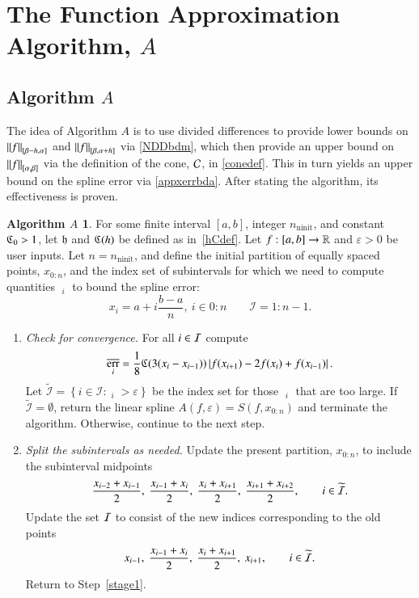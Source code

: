 \documentclass[review]{elsarticle}
\newcommand{\abstol}{\varepsilon}
\newcommand{\zton}{0\!:\!n}
\theoremstyle{definition}
\newtheorem*{algoA}{Algorithm $A$}
\DeclareMathOperator{\ninit}{ninit}
\DeclareMathOperator{\oerr}{\overline{err}}
\begin{document}
\section{The Function Approximation Algorithm, $A$}\label{sec:fappx}


\subsection{Algorithm $A$} \label{subsec:appxalgo}

The idea of Algorithm $A$ is to use divided differences to provide lower bounds on $\norm[{[\beta - h, \alpha]}]{f}$ and $\norm[{[\beta, \alpha+h]}]{f}$ via \eqref{NDDbdm}, which then provide an upper bound on $\norm[{[\alpha,\beta]}]{f}$ via the definition of the cone, $\cc$, in \eqref{conedef}.  This in turn yields an upper bound on the spline error via \eqref{appxerrbda}.  After stating the algorithm, its effectiveness is proven.

\begin{algoA} \label{AlgoA}
For some finite interval $[a,b]$, integer $n_{\ninit}$, and constant $\fC_0 > 1$, let $\fh$ and $\fC(h)$ be defined as in~\eqref{hCdef}.  Let $f:[a,b] \to \reals$ and $\abstol >0$ be user inputs. Let
$n=n_{\ninit}$, and define the initial partition of equally spaced points, $x_{0:n}$, and the index set of subintervals for which we need to compute quantities $\oerr_i$ to bound the spline error:
\[
x_i=a+ i\frac{b-a}{n}, \ i \in \zton \qquad \mathcal{I} = 1\!:\!n-1.
\]

\begin{enumerate}[\em Step 1.]%

\item \label{stage1} \emph{Check for convergence.} For all $i \in \ci$ compute
\begin{equation} \label{oerrdef}
\oerr_i = \frac{1}{8} \fC(3(x_i - x_{i-1}))\abs{f(x_{i+1}) - 2f(x_i) + f(x_{i-1})}.
\end{equation}
Let $\widetilde{\mathcal{I}} = \left\{i \in \mathcal{I}: \oerr_i  > \abstol \right\}$ be the index set for those $\oerr_i $ that are too large.   If $\widetilde{\mathcal{I}} =
\emptyset$, return the linear spline $A(f,\abstol) = S(f, x_{0:n})$ and terminate
the algorithm. Otherwise, continue to the next step.

\item \label{stage2} \emph{Split the subintervals as needed.} Update the present partition, $x_{0:n}$, to include the subinterval midpoints
\[
\frac{x_{i-2} +x_{i-1}}{2}, \ \frac{x_{i-1} +x_{i}}{2}, \ \frac{x_{i} +x_{i+1}}{2}, \  \frac{x_{i+1} +x_{i+2}}{2}, \qquad i \in \widetilde{\ci}.
\] 
Update the set $\ci$ to consist of the new indices corresponding to the old points 
\[
x_{i-1}, \ \frac{x_{i-1} +x_{i}}{2}, \ \frac{x_{i} +x_{i+1}}{2}, \  x_{i+1}, \qquad i \in \widetilde{\ci}.
\] 
Return to Step~\ref{stage1}.
\end{enumerate}
\end{algoA}
\end{document}
